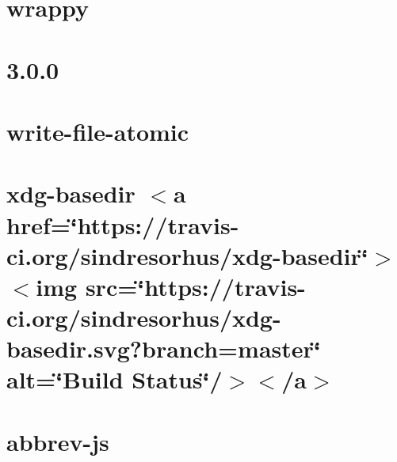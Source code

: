 \let\mypdfximage\pdfximage\def\pdfximage{\immediate\mypdfximage}\documentclass[twoside]{book}
\newcommand{\+}{\discretionary{\mbox{\scriptsize$\hookleftarrow$}}{}{}}
\begin{document}
\chapter{wrappy}
\label{md__c_1__git_hub__p_r_o_y_e_c_t_o-_i_i_i-_g_o_t_rest-api_node_modules_wrappy__r_e_a_d_m_e}

\chapter{3.0.0}
\label{md__c_1__git_hub__p_r_o_y_e_c_t_o-_i_i_i-_g_o_t_rest-api_node_modules_write-file-atomic__c_h_a_n_g_e_l_o_g}

\chapter{write-\/file-\/atomic}
\label{md__c_1__git_hub__p_r_o_y_e_c_t_o-_i_i_i-_g_o_t_rest-api_node_modules_write-file-atomic__r_e_a_d_m_e}

\chapter{xdg-\/basedir $<$a href=\char`\"{}https\+://travis-\/ci.\+org/sindresorhus/xdg-\/basedir\char`\"{}$>$$<$img src=\char`\"{}https\+://travis-\/ci.\+org/sindresorhus/xdg-\/basedir.\+svg?branch=master\char`\"{} alt=\char`\"{}\+Build Status\char`\"{}/$>$$<$/a$>$}
\label{md__c_1__git_hub__p_r_o_y_e_c_t_o-_i_i_i-_g_o_t_rest-api_node_modules_xdg-basedir_readme}

\chapter{abbrev-\/js}
\label{md__c_1__git_hub__p_r_o_y_e_c_t_o-_i_i_i-_g_o_t_rest-api-node-mysql_node_modules_abbrev__r_e_a_d_m_e}

\end{document}
